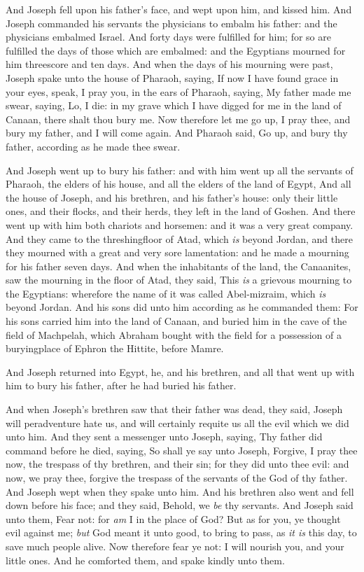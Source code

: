 \documentclass[11pt,letterpaper,oneside]{memoir}
\begin{document}
And Joseph fell upon his father's face, and wept upon him, and kissed
him. And Joseph commanded his servants the physicians to embalm his
father: and the physicians embalmed Israel. And forty days were
fulfilled for him; for so are fulfilled the days of those which are
embalmed: and the Egyptians mourned for him threescore and ten days. And
when the days of his mourning were past, Joseph spake unto the house of
Pharaoh, saying, If now I have found grace in your eyes, speak, I pray
you, in the ears of Pharaoh, saying, My father made me swear, saying,
Lo, I die: in my grave which I have digged for me in the land of Canaan,
there shalt thou bury me. Now therefore let me go up, I pray thee, and
bury my father, and I will come again. And Pharaoh said, Go up, and bury
thy father, according as he made thee swear.

And Joseph went up to bury his father: and with him went up all the
servants of Pharaoh, the elders of his house, and all the elders of the
land of Egypt, And all the house of Joseph, and his brethren, and his
father's house: only their little ones, and their flocks, and their
herds, they left in the land of Goshen. And there went up with him both
chariots and horsemen: and it was a very great company. And they came to
the threshingfloor of Atad, which \emph{is} beyond Jordan, and there
they mourned with a great and very sore lamentation: and he made a
mourning for his father seven days. And when the inhabitants of the
land, the Canaanites, saw the mourning in the floor of Atad, they said,
This \emph{is} a grievous mourning to the Egyptians: wherefore the name
of it was called Abel-mizraim, which \emph{is} beyond Jordan. And his
sons did unto him according as he commanded them: For his sons carried
him into the land of Canaan, and buried him in the cave of the field of
Machpelah, which Abraham bought with the field for a possession of a
buryingplace of Ephron the Hittite, before Mamre.

And Joseph returned into Egypt, he, and his brethren, and all that went
up with him to bury his father, after he had buried his father.

And when Joseph's brethren saw that their father was dead, they said,
Joseph will peradventure hate us, and will certainly requite us all the
evil which we did unto him. And they sent a messenger unto Joseph,
saying, Thy father did command before he died, saying, So shall ye say
unto Joseph, Forgive, I pray thee now, the trespass of thy brethren, and
their sin; for they did unto thee evil: and now, we pray thee, forgive
the trespass of the servants of the God of thy father. And Joseph wept
when they spake unto him. And his brethren also went and fell down
before his face; and they said, Behold, we \emph{be} thy servants. And
Joseph said unto them, Fear not: for \emph{am} I in the place of God?
But as for you, ye thought evil against me; \emph{but} God meant it unto
good, to bring to pass, as \emph{it is} this day, to save much people
alive. Now therefore fear ye not: I will nourish you, and your little
ones. And he comforted them, and spake kindly unto them.
\end{document}
